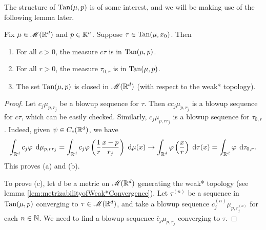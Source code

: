 The structure of $\operatorname{Tan}(\mu,p)$ is of some interest, and we will be making use of the following lemma later.
\begin{lemma} \label{lem:tangent_measure_properties}
    Fix $\mu \in \mathscr{M}(\mathbb{R}^d)$ and $p \in \mathbb{R}^n$. Suppose $\tau \in \operatorname{Tan}(\mu,x_0)$. Then
    \begin{enumerate}[label={\rm (\alph*)}]
        \item For all $c > 0$, the measure $c\tau$ is in $\operatorname{Tan}(\mu,p)$.
        \item For all $r > 0$, the measure $\tau_{0,r}$ is in $\operatorname{Tan}(\mu,p)$.
        \item The set $\operatorname{Tan}(\mu,p)$ is closed in $\mathscr{M}(\mathbb{R}^d)$ (with respect to the weak* topology). 
    \end{enumerate}
\end{lemma}
\begin{proof}
    Let $c_j \mu_{p,r_j}$ be a blowup sequence for $\tau$. Then $c c_j \mu_{p,r_j}$ is a blowup sequence for $c\tau$, which can be easily checked. Similarly, $c_j \mu_{p,rr_j}$ is a blowup sequence for $\tau_{0,r}$. Indeed, given $\psi \in C_c(\mathbb{R}^d)$, we have
    \begin{equation}
        \int_{\mathbb{R}^d} c_j \varphi \; \operatorname{d}\!{\mu_{p,rr_j}} = \int_{\mathbb{R}^d} c_j \varphi\left( \frac{1}{r}\frac{x-p}{r_j} \right) \; \operatorname{d}\!{\mu(x)}
                                           \rightarrow \int_{\mathbb{R}^d} \varphi\left( \frac{x}{r} \right) \; \operatorname{d}\!{\tau(x)}
                                                     = \int_{\mathbb{R}^d} \varphi \; \operatorname{d}\!{\tau_{0,r}}.
    \end{equation}
    This proves (a) and (b).

    To prove (c), let $d$ be a metric on $\mathscr{M}(\mathbb{R}^d)$ generating the weak* topology (see lemma \ref{lem:metrizabilityofWeak*Convergence}).
    Let $\tau^{(n)}$ be a sequence in $\operatorname{Tan}(\mu,p)$ converging to $\tau \in \mathscr{M}(\mathbb{R}^d)$, and take a blowup sequence $c_j^{(n)}\mu_{p,r_j^{(n)}}$ for each $n \in \mathbb{N}$. We need to find a blowup sequence $\overline{c}_j \mu_{p,\overline{r}_j}$ converging to $\tau$.
    

\end{proof}
